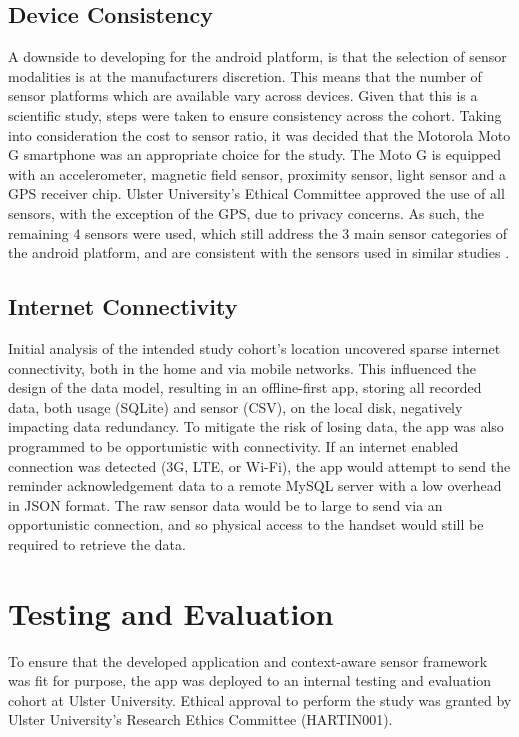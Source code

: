 \subsection{Device Consistency} \label{subsection: taut-deviceconsistency}
A downside to developing for the android platform, is that the selection of sensor modalities is at the manufacturers discretion. This means that the number of sensor platforms which are available vary across devices. Given that this is a scientific study, steps were taken to ensure consistency across the cohort. Taking into consideration the cost to sensor ratio, it was decided that the Motorola Moto G smartphone was an appropriate choice for the study. The Moto G is equipped with an accelerometer, magnetic field sensor, proximity sensor, light sensor and a GPS receiver chip. Ulster University's Ethical Committee approved the use of all sensors, with the exception of the GPS, due to privacy concerns. As such, the remaining 4 sensors were used, which still address the 3 main sensor categories of the android platform, and are consistent with the sensors used in similar studies \cite{Poppinga2014}.

\subsection{Internet Connectivity}
Initial analysis of the intended study cohort's location uncovered sparse internet connectivity, both in the home and via mobile networks. This influenced the design of the data model, resulting in an offline-first app, storing all recorded data, both usage (SQLite) and sensor (CSV), on the local disk, negatively impacting data redundancy. To mitigate the risk of losing data, the app was also programmed to be opportunistic with connectivity. If an internet enabled connection was detected (3G, LTE, or Wi-Fi), the app would attempt to send the reminder acknowledgement data to a remote MySQL server with a low overhead in JSON format. The raw sensor data would be to large to send via an opportunistic connection, and so physical access to the handset would still be required to retrieve the data.

\section{Testing and Evaluation}
To ensure that the developed application and context-aware sensor framework was fit for purpose, the app was deployed to an internal testing and evaluation cohort at Ulster University. Ethical approval to perform the study was granted by Ulster University's Research Ethics Committee (HARTIN001).

